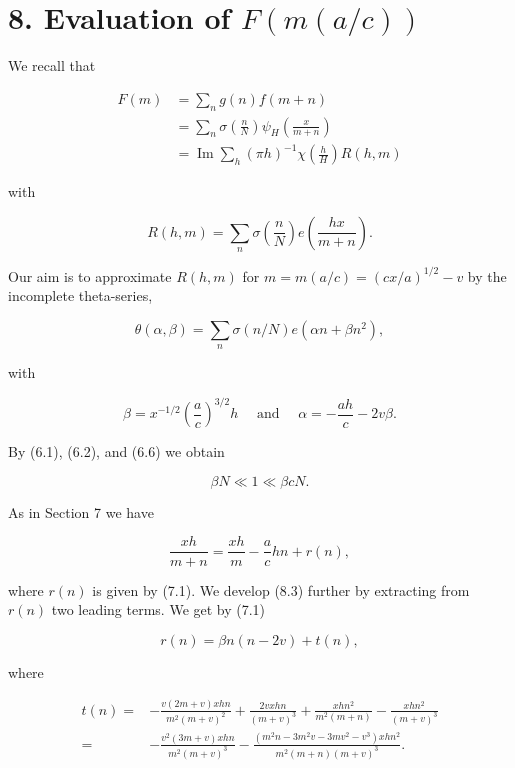 \documentclass[10pt]{article}
\begin{document}
\section*{8. Evaluation of $F(m(a / c))$}
We recall that

$$
\begin{aligned}
F(m) & =\sum_{n} g(n) f(m+n) \\
& =\sum_{n} \sigma\left(\frac{n}{N}\right) \psi_{H}\left(\frac{x}{m+n}\right) \\
& =\operatorname{Im}\sum_{h}(\pi h)^{-1} \chi\left(\frac{h}{H}\right) R(h, m)
\end{aligned}
$$

with

$$
R(h, m)=\sum_{n} \sigma\left(\frac{n}{N}\right) e\left(\frac{h x}{m+n}\right) .
$$

Our aim is to approximate $R(h, m)$ for $m=m(a / c)=(c x / a)^{1 / 2}-v$ by the incomplete theta-series,

$$
\theta(\alpha, \beta)=\sum_{n} \sigma(n / N) e\left(\alpha n+\beta n^{2}\right),
$$

with


\begin{equation*}
\beta=x^{-1 / 2}\left(\frac{a}{c}\right)^{3 / 2} h \quad \text { and } \quad \alpha=-\frac{a h}{c}-2 v \beta . \tag{8.1}
\end{equation*}


By (6.1), (6.2), and (6.6) we obtain


\begin{equation*}
\beta N \ll 1 \ll \beta c N . \tag{8.2}
\end{equation*}


As in Section 7 we have


\begin{equation*}
\frac{x h}{m+n}=\frac{x h}{m}-\frac{a}{c} h n+r(n), \tag{8.3}
\end{equation*}


where $r(n)$ is given by (7.1). We develop (8.3) further by extracting from $r(n)$ two leading terms. We get by (7.1)

$$
r(n)=\beta n(n-2 v)+t(n),
$$

where

$$
\begin{aligned}
t(n)={}&-\frac{v(2m+v)xhn}{m^{2}(m+v)^{2}}
       +\frac{2vxhn}{(m+v)^{3}}
       +\frac{xhn^{2}}{m^{2}(m+n)}
       -\frac{xhn^{2}}{(m+v)^{3}} \\
={}&-\frac{v^{2}(3m+v)xhn}{m^{2}(m+v)^{3}}
    -\frac{(m^{2}n-3m^{2}v-3mv^{2}-v^{3})xhn^{2}}
           {m^{2}(m+n)(m+v)^{3}}.
\end{aligned}
$$
\end{document}
